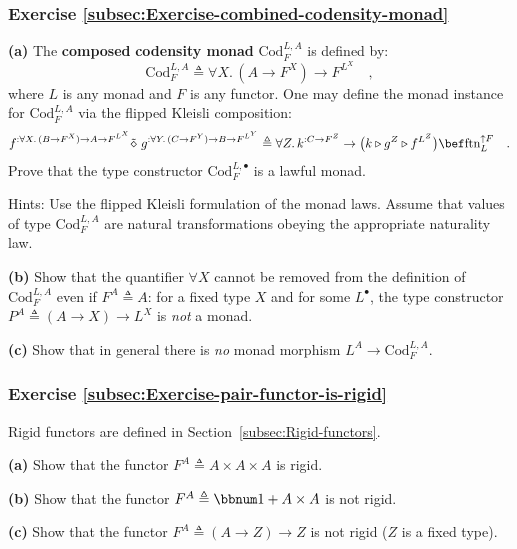 \subsubsection{Exercise \label{subsec:Exercise-combined-codensity-monad}\ref{subsec:Exercise-combined-codensity-monad}}

\textbf{(a)} The \textbf{composed}
\textbf{codensity monad} $\text{Cod}_{F}^{L,A}$ is defined by:
\[
\text{Cod}_{F}^{L,A}\triangleq\forall X.\,(A\rightarrow F^{X})\rightarrow F^{L^{X}}\quad,
\]
where $L$ is any monad and $F$ is any functor. One may define the
monad instance for $\text{Cod}_{F}^{L,A}$ via the flipped Kleisli
composition:
\[
f^{:\forall X.\,(B\rightarrow F^{X})\rightarrow A\rightarrow F^{L^{X}}}\tilde{\diamond}\,\,g^{:\forall Y.\,(C\rightarrow F^{Y})\rightarrow B\rightarrow F^{L^{Y}}}\triangleq\forall Z.\,k^{:C\rightarrow F^{Z}}\rightarrow\big(k\triangleright g^{Z}\triangleright f^{L^{Z}}\big)\bef\text{ftn}_{L}^{\uparrow F}\quad.
\]
Prove that the type constructor $\text{Cod}_{F}^{L,\bullet}$ is a
lawful monad.

Hints: Use the flipped Kleisli formulation of the monad laws. Assume
that values of type $\text{Cod}_{F}^{L,A}$ are natural transformations
obeying the appropriate naturality law.

\textbf{(b)} Show that the quantifier $\forall X$ cannot be removed
from the definition of $\text{Cod}_{F}^{L,A}$ even if $F^{A}\triangleq A$:
for a fixed type $X$ and for some $L^{\bullet}$, the type constructor
$P^{A}\triangleq(A\rightarrow X)\rightarrow L^{X}$ is \emph{not}
a monad.

\textbf{(c)} Show that in general there is \emph{no} monad morphism
$L^{A}\rightarrow\text{Cod}_{F}^{L,A}$. 

\subsubsection{Exercise \label{subsec:Exercise-pair-functor-is-rigid}\ref{subsec:Exercise-pair-functor-is-rigid}}

Rigid functors are defined in Section~\ref{subsec:Rigid-functors}.

\textbf{(a)} Show that the functor $F^{A}\triangleq A\times A\times A$
is rigid. 

\textbf{(b)} Show that the functor $F^{A}\triangleq\bbnum 1+A\times A$
is not rigid. 

\textbf{(c)} Show that the functor $F^{A}\triangleq\left(A\rightarrow Z\right)\rightarrow Z$
is not rigid ($Z$ is a fixed type).

